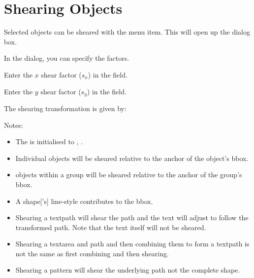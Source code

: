 \section{Shearing Objects}\label{sec:shearobjects}


Selected \glspl{object} can be sheared with
the  menu item. This will open up the
 dialog box.


In the  dialog, you can specify the
 factors.

Enter the $x$ shear factor ($s_x$) in the  field.

Enter the $y$ shear factor ($s_y$) in the  field.

The shearing transformation is given by:
\TeXParserLibToImage
[div=displaymath,alt={
 (
   [ 1 , sX ]
   [ sY , 1 ]
 )
 (
   [ x ]
   [ y ]
 )
=
 (
   [ x + sX \texttimes\ y ]
   [ y + sY \texttimes\ x ]
 )
}]
{
\[
  \left(
  \begin{array}{cc}
  1 & s_x\\
  s_y & 1
  \end{array}
  \right)
  \left(
  \begin{array}{c}
  x\\
  y
  \end{array}
  \right)
  =
  \left(
  \begin{array}{l}
  x + s_x y\\
  y + s_y x
  \end{array}
  \right)
  \]
}

Notes:
\begin{itemize}
\item The  is initialised to
, .

\item Individual \glspl*{object}
will be sheared relative to the anchor of the
object's \gls{bbox}.

\item \Glspl*{object} within a 
\gls{group} will be sheared relative to the anchor of the group's \gls*{bbox}.

\item A \gls*{shape}['s] \gls{line-style} contributes to the \gls{bbox}. 

\item Shearing a \gls{textpath} will shear the path and the text
will adjust to follow the transformed path. Note that the text
itself will not be sheared.

\item Shearing a \gls*{textarea} and \gls*{path} and then combining
them to form a \gls*{textpath} is not the same as first combining
and then shearing. 

\item Shearing a \gls{pattern} will shear the underlying path not
the complete shape.
\end{itemize}

